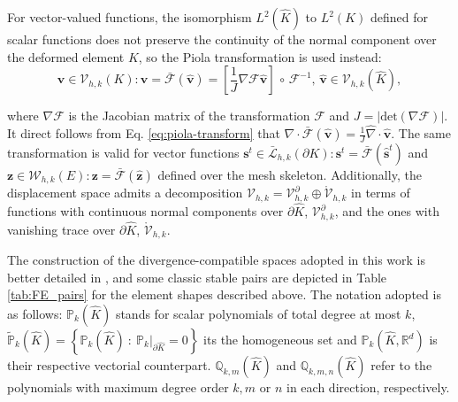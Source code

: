 \documentclass[english,11pt,3p,number,sort&compress]{elsarticle}
\begin{document}
For vector-valued functions, the isomorphism $L^2(\hat{K})$ to $L^2(K)$ defined for scalar functions does not preserve the continuity of the normal component over the deformed element $K$, so the Piola transformation is used instead: 
\begin{equation} \label{eq:piola-transform}
\bm{v} \in \mathcal{V}_{h,k}(K): \bm{v}=\bar{\mathcal{F}}(\bm{\hat{v}})=\left[\frac{1}{J}\nabla\mathcal{F}\bm{\hat{v}} \right] \,\circ\, \mathcal{F}^{-1}, \, \bm{\hat{v}} \in \mathcal{V}_{h,k}(\hat{K}), 
\end{equation}

\noindent where $\nabla\mathcal{F}$ is the Jacobian matrix of the transformation $\mathcal{F}$ and $J=\lvert\text{det}(\nabla\mathcal{F})\lvert$. It direct follows from Eq. \eqref{eq:piola-transform} that $\nabla \cdot \bar{\mathcal{F}}(\bm{\hat{v}})=\frac{1}{J} \hat{\nabla} \cdot \bm{\hat{v}}$. The same transformation is valid for vector functions $\bm{s}^t \in \bar{\mathcal{L}}_{h,k}(\partial K): \bm{s}^t=\bar{\mathcal{F}}(\bm{\hat{s}}^t)$ and $\bm{z} \in \mathcal{W}_{h,k}(E): \bm{z}=\bar{\mathcal{F}}(\bm{\hat{z}})$ defined over the mesh skeleton. Additionally, the displacement space admits a decomposition $\mathcal{V}_{h,k}=\mathcal{V}^\partial_{h,k} \oplus \mathring{\mathcal{V}}_{h,k}$ in terms of functions with continuous normal components over $\partial\hat{K}$, $\mathcal{V}^\partial_{h,k}$, and the ones with vanishing trace over $\partial\hat{K}$, $\mathring{\mathcal{V}}_{h,k}$.

The construction of the divergence-compatible spaces adopted in this work is better detailed in \cite{de2013new,devloo2022efficient}, and some classic stable pairs are depicted in Table \ref{tab:FE_pairs} for the element shapes described above. The notation adopted is as follows: $\mathbb{P}_k(\hat{K})$ stands for scalar polynomials of total degree at most $k$, $\tilde{\mathbb{P}}_k(\hat{K})=\left\{\mathbb{P}_k(\hat{K}) ~:~\mathbb{P}_k\lvert_{\partial\hat{K}}=0 \right\}$ its the homogeneous set and $\mathbb{P}_k(\hat{K},\mathbb{R}^d)$ is their respective vectorial counterpart. $\mathbb{Q}_{k,m}(\hat{K})$ and $\mathbb{Q}_{k,m,n}(\hat{K})$ refer to the polynomials with maximum degree order $k,m$ or $n$ in each direction, respectively.
\end{document}
